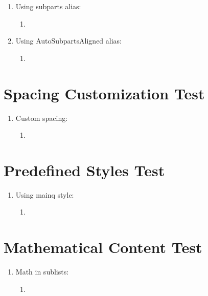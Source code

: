 \documentclass{article}
\begin{document}
\begin{enumerate}
  \item Using subparts alias:
  \begin{enumerate}
    \item {}
  \end{enumerate}
  \item Using AutoSubpartsAligned alias:
  \begin{enumerate}
    \item {}
  \end{enumerate}
\end{enumerate}

\section{Spacing Customization Test}

\setenumsublabelwidth{3em}
\setenumsubitemwidth{2cm}

\begin{enumerate}
  \item Custom spacing:
  \begin{enumerate}
    \item {}
  \end{enumerate}
\end{enumerate}

\setenumsublabelwidth{2.2em}
\setenumsubitemwidth{1.5cm}

\section{Predefined Styles Test}

\begin{enumerate}[mainq]
  \item Using mainq style:
  \begin{enumerate}[subq]
    \item {}
  \end{enumerate}
\end{enumerate}

\section{Mathematical Content Test}

\begin{enumerate}
  \item Math in sublists:
  \begin{enumerate}
    \item {}
  \end{enumerate}
\end{enumerate}
\end{document}
